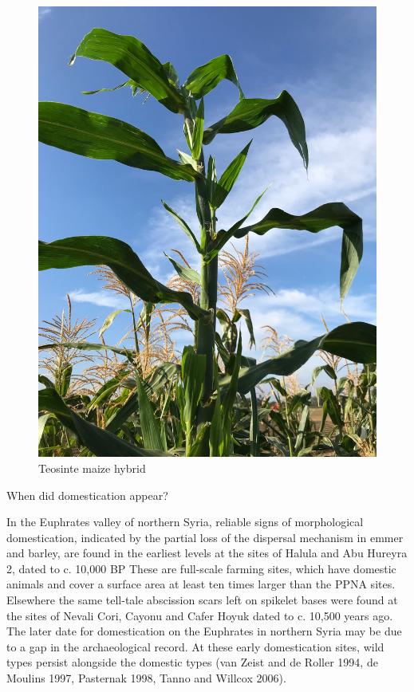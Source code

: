 \documentclass[ignorenonframetext,aspectratio=169]{beamer}
\begin{document}
\begin{frame}{}
\protect\hypertarget{section-6}{}

\begin{figure}

{\centering \includegraphics[width=0.4\linewidth]{./../images/Teosinte_maize_hybrid_cross} 

}

\caption{Teosinte maize hybrid}\label{fig:unnamed-chunk-1}
\end{figure}

\end{frame}

\begin{frame}{When did domestication appear?}
\protect\hypertarget{when-did-domestication-appear}{}

In the Euphrates valley of northern Syria, reliable signs of
morphological domestication, indicated by the partial loss of the
dispersal mechanism in emmer and barley, are found in the earliest
levels at the sites of Halula and Abu Hureyra 2, dated to c. 10,000 BP
These are full-scale farming sites, which have domestic animals and
cover a surface area at least ten times larger than the PPNA sites.
Elsewhere the same tell-tale abscission scars left on spikelet bases
were found at the sites of Nevali Cori, Cayonu and Cafer Hoyuk dated to
c. 10,500 years ago. The later date for domestication on the Euphrates
in northern Syria may be due to a gap in the archaeological record. At
these early domestication sites, wild types persist alongside the
domestic types (van Zeist and de Roller 1994, de Moulins 1997, Pasternak
1998, Tanno and Willcox 2006).

\end{frame}
\end{document}
